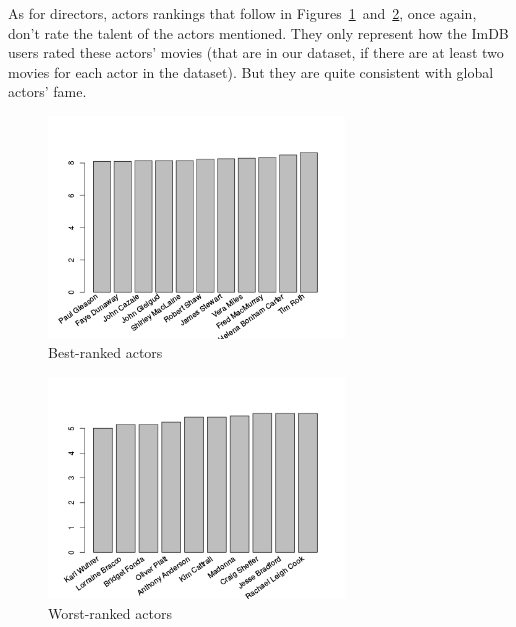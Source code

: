 As for directors, actors rankings that follow in Figures~\ref{fig:bestActors}~and~\ref{fig:worstActors}, once again, don't rate the talent of the actors mentioned.
They only represent how the ImDB users rated these actors' movies (that are in our dataset, if there are at least two movies for each actor in the dataset).
But they are quite consistent with global actors' fame.

\begin{figure}[!h]
\begin{center}
\includegraphics[width=0.70\textwidth]{../src/pre-processing/stats/results/bestActors.png}
\end{center}
\caption{Best-ranked actors}
\label{fig:bestActors}
\end{figure}

\begin{figure}[!h]
\begin{center}
\includegraphics[width=0.70\textwidth]{../src/pre-processing/stats/results/worstActors.png}
\end{center}
\caption{Worst-ranked actors}
\label{fig:worstActors}
\end{figure}

